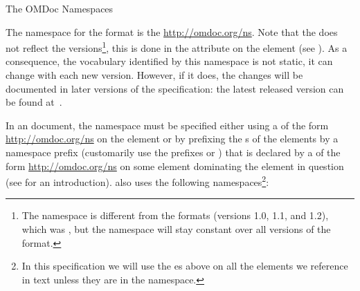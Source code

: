 \begin{omgroup}[id=omdoc-ns]{The OMDoc Namespaces}

The namespace for the {} format is the 
\url{http://omdoc.org/ns}. Note that the \omdoc {}
does not reflect the versions\footnote{The namespace is different from the {}
  formats (versions 1.0, 1.1, and 1.2), which was
  {}, but the {} namespace will stay
  constant over all versions of the {} format.}, this is done in the
{} attribute on the {} element
 (see ).  As a consequence, the
\omdoc vocabulary identified by this namespace is not static, it can change with each
new \omdoc version. However, if it does, the changes will be documented in later
versions of the specification: the latest released version can be found
at~\cite{URL:omdocspec}.

In an \omdoc document, the \omdoc namespace must be specified either using a
{} of the form
{}\url{http://omdoc.org/ns}{} on the  element
or by prefixing the {s} of the \omdoc elements by a namespace
prefix (\omdoc customarily use the prefixes {} or {}) that
is declared by a {} of the form
{}\url{http://omdoc.org/ns}{} on some element dominating the
\omdoc element in question (see {} for an introduction). \omdoc also
uses the following namespaces\footnote{In this specification we will use the
  {es} above on all the elements we reference in text unless
  they are in the \omdoc namespace.}:


\end{omgroup}
